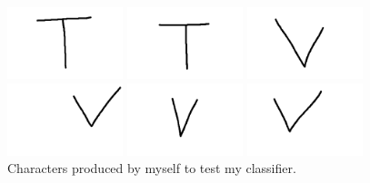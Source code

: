 \documentclass[11pt, a4paper]{article}
\begin{document}
\begin{figure}[!h]
\begin{minipage}[b]{0.3\textwidth}
	\end{minipage}	
	\begin{minipage}[b]{0.3\textwidth}
		\includegraphics[width=0.3\textwidth]{test/T3.png}
	\end{minipage}	
	\begin{minipage}[b]{0.3\textwidth}
		\includegraphics[width=0.3\textwidth]{test/T4.png}
	\end{minipage}
	\begin{minipage}[b]{0.3\textwidth}
		\includegraphics[width=0.3\textwidth]{test/V1.png}
	\end{minipage}	
	\begin{minipage}[b]{0.3\textwidth}
		\includegraphics[width=0.3\textwidth]{test/V2.png}
	\end{minipage}	
	\begin{minipage}[b]{0.3\textwidth}
		\includegraphics[width=0.3\textwidth]{test/V3.png}
	\end{minipage}	
	\begin{minipage}[b]{0.3\textwidth}
		\includegraphics[width=0.3\textwidth]{test/V4.png}
	\end{minipage}	
	\caption{Characters produced by myself to test my classifier.}
	\label{fig:test_characters}
\end{figure}
\end{document}
